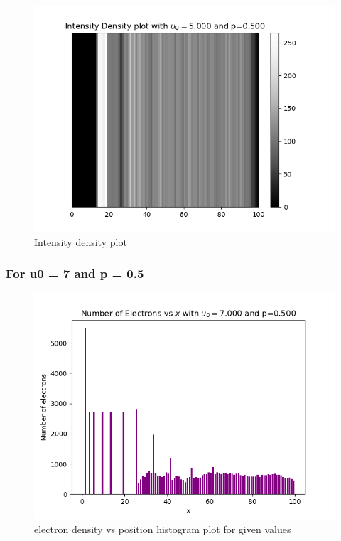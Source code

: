 \documentclass[11pt]{article}
\begin{document}
\begin{figure}[H]
    \centering
    \includegraphics[scale = 1]{2_d.png}
    \caption{Intensity density plot}
\end{figure}

\subsubsection{For u0 = 7 and p = 0.5}

\begin{figure}[H]
    \centering
    \includegraphics[scale = 1]{3_a.png}
    \caption{electron density vs position histogram plot for given values}
\end{figure}
\end{document}

